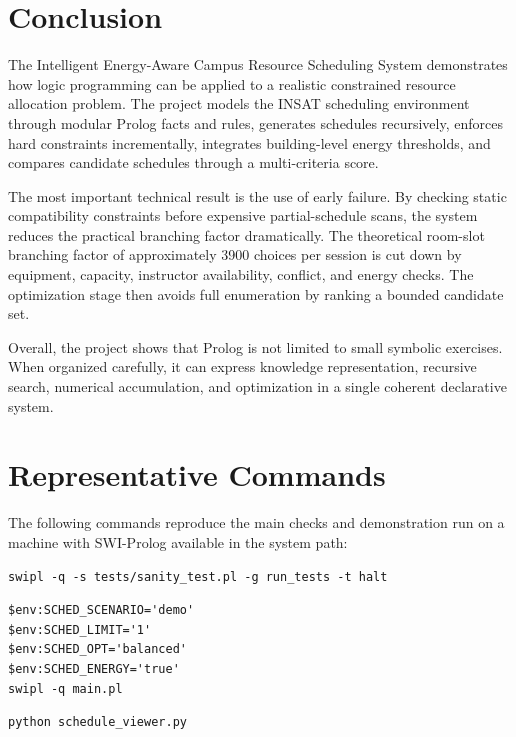 \documentclass[12pt,a4paper]{article}
\begin{document}
\section{Conclusion}

The Intelligent Energy-Aware Campus Resource Scheduling System demonstrates how logic programming can be applied to a realistic constrained resource allocation problem. The project models the INSAT scheduling environment through modular Prolog facts and rules, generates schedules recursively, enforces hard constraints incrementally, integrates building-level energy thresholds, and compares candidate schedules through a multi-criteria score.

The most important technical result is the use of early failure. By checking static compatibility constraints before expensive partial-schedule scans, the system reduces the practical branching factor dramatically. The theoretical room-slot branching factor of approximately 3900 choices per session is cut down by equipment, capacity, instructor availability, conflict, and energy checks. The optimization stage then avoids full enumeration by ranking a bounded candidate set.

Overall, the project shows that Prolog is not limited to small symbolic exercises. When organized carefully, it can express knowledge representation, recursive search, numerical accumulation, and optimization in a single coherent declarative system.

\appendix
\section{Representative Commands}

The following commands reproduce the main checks and demonstration run on a machine with SWI-Prolog available in the system path:

\begin{lstlisting}[language=PlainText,caption={Run sanity tests}]
swipl -q -s tests/sanity_test.pl -g run_tests -t halt
\end{lstlisting}

\begin{lstlisting}[language=PlainText,caption={Run the demo scheduler on Windows PowerShell}]
$env:SCHED_SCENARIO='demo'
$env:SCHED_LIMIT='1'
$env:SCHED_OPT='balanced'
$env:SCHED_ENERGY='true'
swipl -q main.pl
\end{lstlisting}

\begin{lstlisting}[language=PlainText,caption={Launch the terminal visualization tool}]
python schedule_viewer.py
\end{lstlisting}
\end{document}
